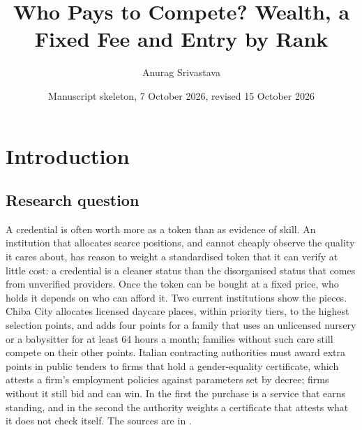 \newcommand{\krow}[4]{#1 & #2 & \rowref{#3} & #4 \\ \addlinespace}
\newcommand{\mrow}[4]{#1 & #2 & #3 & \lean{#4} & p.~\pageref{proof:#1} \\ \addlinespace}
\newcommand{\lrow}[6]{#1 & \citet{#2} & #3 & ``#4'' & #5 & \rowref{#6} \\ \addlinespace}
\newcommand{\crow}[3]{#1 & #2 & \rowref{#3} \\ \addlinespace}

\newenvironment{mproof}[2]
  {\subsection*{Proof of #1}\label{proof:#1}%
   {\raggedright\noindent\textit{Lean:} \lean{#2}.\par}\smallskip}
  {\par\hfill$\square$\par\medskip}

\title{Who Pays to Compete? Wealth, a Fixed Fee and Entry by Rank}
\author{Anurag Srivastava}
\date{Manuscript skeleton, 7 October 2026, revised 15 October 2026}


\maketitle

\section{Introduction}

\subsection{Research question}
\label{sec:question}

A credential is often worth more as a token than as evidence of skill. An
institution that allocates scarce positions, and cannot cheaply observe the
quality it cares about, has reason to weight a standardised token that it can
verify at little cost: a credential is a cleaner status than the disorganised
status that comes from unverified providers. Once the token can be bought at a fixed price, who holds
it depends on who can afford it. Two current institutions show the pieces.
Chiba City allocates licensed daycare places, within priority tiers, to the
highest selection points, and adds four points for a family that uses an
unlicensed nursery or a babysitter for at least 64 hours a month; families
without such care still compete on their other points. Italian contracting authorities must award extra points in
public tenders to firms that hold a gender-equality certificate, which attests
a firm's employment policies against parameters set by decree; firms without
it still bid and can win. In the first the purchase is a service that earns
standing, and in the second the authority weights a certificate that attests
what it does not check itself. The sources are in
.

